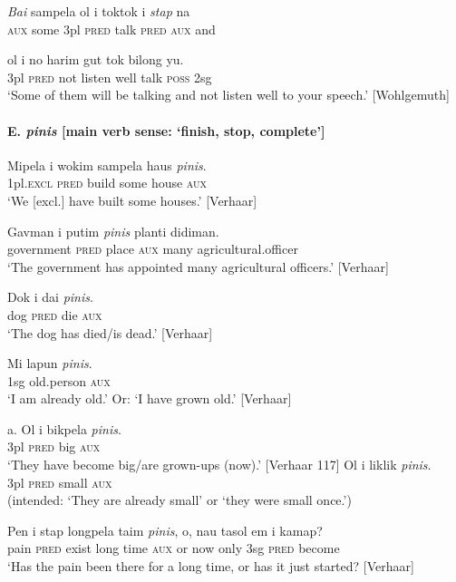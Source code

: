 \ea \gll  \textit{Bai}  sampela  ol  i  toktok  i \textit{stap}  na\\
\textsc{aux}  some  3pl  \textsc{pred}  talk  \textsc{pred}  \textsc{aux}  and\\
\z

\ea
 \gll  ol  i  no  harim  gut  tok  bilong  yu.\\
3pl  \textsc{pred}  not  listen  well  talk  \textsc{poss}  2sg\\
\glt ‘Some of them will be talking and not listen well to your speech.’ [Wohlgemuth]
\z

\paragraph*{E. \textit{pinis}  [main verb sense: ‘finish, stop, complete’]}
\ea
\gll  Mipela  i  wokim  sampela  haus  \textit{pinis}.\\
1pl.\textsc{excl}  \textsc{pred}  build  some  house  \textsc{aux}\\
\glt ‘We [excl.] have built some houses.’  [Verhaar]
\z

\ea
\gll  Gavman  i  putim  \textit{pinis}  planti  didiman.\\
government  \textsc{pred} place  \textsc{aux}  many  agricultural.officer\\
\glt ‘The government has appointed many agricultural officers.’  [Verhaar]
\z

\ea
\gll  Dok  i  dai  \textit{pinis}.\\
dog  \textsc{pred}  die  \textsc{aux}\\
\glt ‘The dog has died/is dead.’  [Verhaar]
\z

\ea
\gll  Mi  lapun  \textit{pinis}.\\
1sg  old.person  \textsc{aux}\\
\glt ‘I am already old.’ Or: ‘I have grown old.’  [Verhaar]
\z

\ea \ea
\gll a. Ol  i  bikpela  \textit{pinis}.\\
3pl  \textsc{pred}  big  \textsc{aux}\\
\glt ‘They have become big/are grown-ups (now).’  [Verhaar 117]
\ex \gll  *Ol  i  liklik  \textit{pinis}.\\
 3pl  \textsc{pred}  small  \textsc{aux}\\
\glt (intended: ‘They are already small’ or ‘they were small once.’)
\z \z

\ea
\gll Pen  i  stap  longpela  taim  \textit{pinis},  o,  nau  tasol  em  i  kamap?\\
pain  \textsc{pred}  exist  long  time  \textsc{aux}  or  now  only  3sg  \textsc{pred}  become\\
\glt ‘Has the pain been there for a long time, or has it just started?  [Verhaar]
\z

